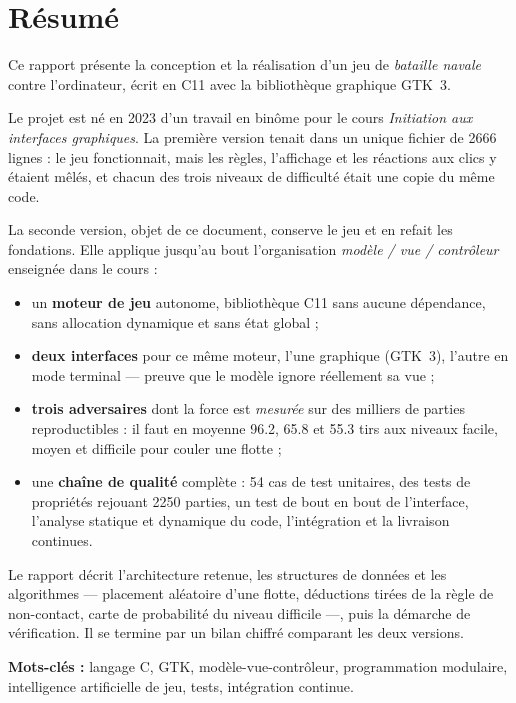 \chapter*{Résumé}

Ce rapport présente la conception et la réalisation d'un jeu de \emph{bataille navale}
contre l'ordinateur, écrit en C11 avec la bibliothèque graphique GTK~3.

Le projet est né en 2023 d'un travail en binôme pour le cours \emph{Initiation aux interfaces
    graphiques}. La première version tenait dans un unique fichier de \num{2666} lignes : le jeu
fonctionnait, mais les règles, l'affichage et les réactions aux clics y étaient mêlés, et
chacun des trois niveaux de difficulté était une copie du même code.

La seconde version, objet de ce document, conserve le jeu et en refait les fondations. Elle
applique jusqu'au bout l'organisation \emph{modèle / vue / contrôleur} enseignée dans le
cours :

\begin{itemize}
    \item un \textbf{moteur de jeu} autonome, bibliothèque C11 sans aucune dépendance, sans
          allocation dynamique et sans état global ;
    \item \textbf{deux interfaces} pour ce même moteur, l'une graphique (GTK~3), l'autre en
          mode terminal --- preuve que le modèle ignore réellement sa vue ;
    \item \textbf{trois adversaires} dont la force est \emph{mesurée} sur des milliers de
          parties reproductibles : il faut en moyenne \num{96.2}, \num{65.8} et \num{55.3}
          tirs aux niveaux facile, moyen et difficile pour couler une flotte ;
    \item une \textbf{chaîne de qualité} complète : 54 cas de test unitaires, des tests de
          propriétés rejouant \num{2250} parties, un test de bout en bout de l'interface,
          l'analyse statique et dynamique du code, l'intégration et la livraison continues.
\end{itemize}

Le rapport décrit l'architecture retenue, les structures de données et les algorithmes ---
placement aléatoire d'une flotte, déductions tirées de la règle de non-contact, carte de
probabilité du niveau difficile ---, puis la démarche de vérification. Il se termine par un
bilan chiffré comparant les deux versions.

\vspace{1.2em}
\noindent\textbf{Mots-clés :} langage C, GTK, modèle-vue-contrôleur, programmation
modulaire, intelligence artificielle de jeu, tests, intégration continue.

